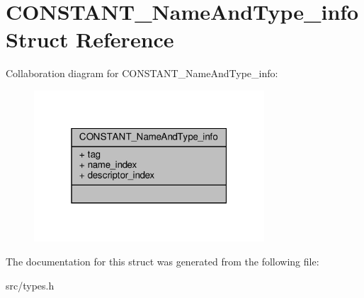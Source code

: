 \hypertarget{structCONSTANT__NameAndType__info}{}\section{C\+O\+N\+S\+T\+A\+N\+T\+\_\+\+Name\+And\+Type\+\_\+info Struct Reference}
\label{structCONSTANT__NameAndType__info}


Collaboration diagram for C\+O\+N\+S\+T\+A\+N\+T\+\_\+\+Name\+And\+Type\+\_\+info\+:
\nopagebreak
\begin{figure}[H]
\begin{center}
\leavevmode
\includegraphics[width=244pt]{structCONSTANT__NameAndType__info__coll__graph}
\end{center}
\end{figure}


The documentation for this struct was generated from the following file\+:\begin{DoxyCompactItemize}
\item 
src/types.\+h\end{DoxyCompactItemize}
